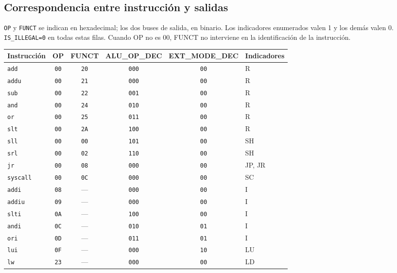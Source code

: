 \documentclass[11pt,a4paper]{article}
\newcommand{\sig}[1]{\texttt{#1}}
\begin{document}
\clearpage
\subsection{Correspondencia entre instrucción y salidas}

\sig{OP} y \sig{FUNCT} se indican en hexadecimal; los dos buses de salida,
en binario. Los indicadores enumerados valen 1 y los demás valen 0.
\sig{IS\_ILLEGAL=0} en todas estas filas. Cuando OP no es 00, FUNCT no
interviene en la identificación de la instrucción.

\begin{center}\small\setlength{\tabcolsep}{5pt}
\begin{tabularx}{\linewidth}{@{}l c c c c X@{}}
\toprule
Instrucción & OP & FUNCT & ALU\_OP\_DEC & EXT\_MODE\_DEC & Indicadores \\
\midrule
\sig{add} & \sig{00} & \texttt{20} & \sig{000} & \sig{00} & R \\
\sig{addu} & \sig{00} & \texttt{21} & \sig{000} & \sig{00} & R \\
\sig{sub} & \sig{00} & \texttt{22} & \sig{001} & \sig{00} & R \\
\sig{and} & \sig{00} & \texttt{24} & \sig{010} & \sig{00} & R \\
\sig{or} & \sig{00} & \texttt{25} & \sig{011} & \sig{00} & R \\
\sig{slt} & \sig{00} & \texttt{2A} & \sig{100} & \sig{00} & R \\
\sig{sll} & \sig{00} & \texttt{00} & \sig{101} & \sig{00} & SH \\
\sig{srl} & \sig{00} & \texttt{02} & \sig{110} & \sig{00} & SH \\
\sig{jr} & \sig{00} & \texttt{08} & \sig{000} & \sig{00} & JP, JR \\
\sig{syscall} & \sig{00} & \texttt{0C} & \sig{000} & \sig{00} & SC \\
\sig{addi} & \sig{08} & --- & \sig{000} & \sig{00} & I \\
\sig{addiu} & \sig{09} & --- & \sig{000} & \sig{00} & I \\
\sig{slti} & \sig{0A} & --- & \sig{100} & \sig{00} & I \\
\sig{andi} & \sig{0C} & --- & \sig{010} & \sig{01} & I \\
\sig{ori} & \sig{0D} & --- & \sig{011} & \sig{01} & I \\
\sig{lui} & \sig{0F} & --- & \sig{000} & \sig{10} & LU \\
\sig{lw} & \sig{23} & --- & \sig{000} & \sig{00} & LD \\

\end{tabularx}
\end{center}
\end{document}
